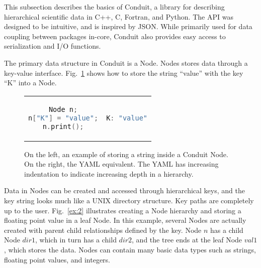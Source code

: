 This subsection describes the basics of Conduit, a library for describing 
hierarchical scientific data in C++, C, Fortran, and Python.
%
The API was designed to be intuitive, and is inspired by JSON.
%
While primarily used for data coupling between packages in-core,
Conduit also provides easy access to serialization and I/O functions.
%
%

The primary data structure in Conduit is a Node.
%
Nodes stores data through a key-value interface.
%
Fig.~\ref{ex:1} shows how to store the string ``value'' with the key ``K'' into a Node.

\begin{figure}
\begin{tabular}{cc}
  \begin{minipage}{.5\textwidth}
  \centering
    \begin{lstlisting}[language=C++]
Node n;
n["K"] = "value";
n.print();
    \end{lstlisting}
  \end{minipage}
  &
  \begin{minipage}{.5\textwidth}
  \centering
  \begin{lstlisting}[language=C++]
K: "value"
  \end{lstlisting}
  \end{minipage}
\end{tabular}
\caption{\label{ex:1}On the left, an example of storing a string inside a Conduit Node. On the right, the YAML equivalent.  The YAML has increasing indentation to indicate increasing depth in a hierarchy.}
\end{figure}

Data in Nodes can be created and accessed through hierarchical keys,
and the key string looks much like a UNIX directory structure.
%
Key paths are completely up to the user.
%
Fig.~\ref{ex:2} illustrates creating a Node hierarchy
and storing a floating point value in a leaf Node.
%
In this example, several Nodes are actually created with parent child
relationships defined by the key.
%
Node $n$ has a child Node $dir1$, which in turn has a child $dir2$,
and the tree ends at the leaf Node $val1$, which stores the data.
%
Nodes can contain many basic data types such as strings,
floating point values, and integers.

